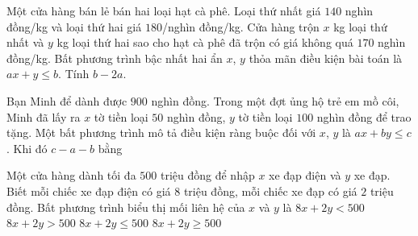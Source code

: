 \begin{bt}%
	Một cửa hàng bán lẻ bán hai loại hạt cà phê. Loại thứ nhất giá $140$ nghìn đồng/kg và loại thứ hai giá $180$/nghìn đồng/kg. Cửa hàng trộn $x$ kg loại thứ nhất và $y$ kg loại thứ hai sao cho hạt cà phê đã trộn có giá không quá $170$ nghìn đồng/kg. Bất phương trình bậc nhất hai ẩn $x$, $y$ thỏa mãn điều kiện bài toán là $ ax+y\le b $. Tính $ b-2a $.
	
\end{bt}

\begin{bt}%
	Bạn Minh để dành được $900$ nghìn đồng. Trong một đợt ủng hộ trẻ em mồ côi, Minh đã lấy ra $x$ tờ tiền loại $50$ nghìn đồng, $y$ tờ tiền loại $100$ nghìn đồng để trao tặng. Một bất phương trình mô tả điều kiện ràng buộc đối với $x$, $y$ là $ax+by\le c$. Khi đó $c-a-b$ bằng
\end{bt}

\begin{ex}%
	Một cửa hàng dành tối đa $500$ triệu đồng để nhập $x$ xe đạp điện và $y$ xe đạp. Biết mỗi chiếc xe đạp điện có giá $8$ triệu đồng, mỗi chiếc xe đạp có giá $2$ triệu đồng. Bất phương trình biểu thị mối liên hệ của $x$ và $y$ là
	\choice
		{$8x+2y<500$}
		{$8x+2y>500$}
		{\True $8x+2y\le 500$}
		{$8x+2y\ge 500$}
\end{ex}
